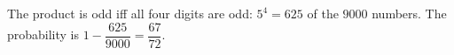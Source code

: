 The product is odd iff all four digits are odd: $5^4=625$ of the $9000$ numbers. The probability is $1-\dfrac{625}{9000}=\boxed{\dfrac{67}{72}}$.
